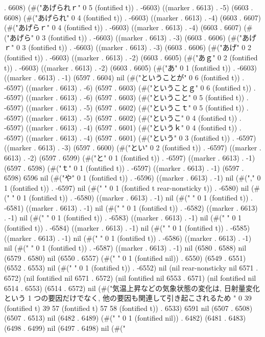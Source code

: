 . 6608) (#("あげられｒ" 0 5 (fontified t)) . -6603) ((marker . 6613) . -5) (6603 . 6608) (#("あげられ" 0 4 (fontified t)) . -6603) ((marker . 6613) . -4) (6603 . 6607) (#("あげらｒ" 0 4 (fontified t)) . -6603) ((marker . 6613) . -4) (6603 . 6607) (#("あげら" 0 3 (fontified t)) . -6603) ((marker . 6613) . -3) (6603 . 6606) (#("あげｒ" 0 3 (fontified t)) . -6603) ((marker . 6613) . -3) (6603 . 6606) (#("あげ" 0 2 (fontified t)) . -6603) ((marker . 6613) . -2) (6603 . 6605) (#("あｇ" 0 2 (fontified t)) . -6603) ((marker . 6613) . -2) (6603 . 6605) (#("あ" 0 1 (fontified t)) . -6603) ((marker . 6613) . -1) (6597 . 6604) nil (#("ということが" 0 6 (fontified t)) . -6597) ((marker . 6613) . -6) (6597 . 6603) (#("ということｇ" 0 6 (fontified t)) . -6597) ((marker . 6613) . -6) (6597 . 6603) (#("ということ" 0 5 (fontified t)) . -6597) ((marker . 6613) . -5) (6597 . 6602) (#("というこｔ" 0 5 (fontified t)) . -6597) ((marker . 6613) . -5) (6597 . 6602) (#("というこ" 0 4 (fontified t)) . -6597) ((marker . 6613) . -4) (6597 . 6601) (#("というｋ" 0 4 (fontified t)) . -6597) ((marker . 6613) . -4) (6597 . 6601) (#("という" 0 3 (fontified t)) . -6597) ((marker . 6613) . -3) (6597 . 6600) (#("とい" 0 2 (fontified t)) . -6597) ((marker . 6613) . -2) (6597 . 6599) (#("と" 0 1 (fontified t)) . -6597) ((marker . 6613) . -1) (6597 . 6598) (#("ｔ" 0 1 (fontified t)) . -6597) ((marker . 6613) . -1) (6597 . 6598) 6596 nil (#("や" 0 1 (fontified t)) . -6596) ((marker . 6613) . -1) nil (#("," 0 1 (fontified t)) . -6597) nil (#("
" 0 1 (fontified t rear-nonsticky t)) . -6580) nil (#("
" 0 1 (fontified t)) . -6580) ((marker . 6613) . -1) nil (#(" " 0 1 (fontified t)) . -6581) ((marker . 6613) . -1) nil (#(" " 0 1 (fontified t)) . -6582) ((marker . 6613) . -1) nil (#(" " 0 1 (fontified t)) . -6583) ((marker . 6613) . -1) nil (#(" " 0 1 (fontified t)) . -6584) ((marker . 6613) . -1) nil (#(" " 0 1 (fontified t)) . -6585) ((marker . 6613) . -1) nil (#(" " 0 1 (fontified t)) . -6586) ((marker . 6613) . -1) nil (#(" " 0 1 (fontified t)) . -6587) ((marker . 6613) . -1) nil (6580 . 6588) nil (6579 . 6580) nil (6550 . 6557) (#(" " 0 1 (fontified nil)) . 6550) (6549 . 6551) (6552 . 6553) nil (#("
" 0 1 (fontified t)) . -6552) nil (nil rear-nonsticky nil 6571 . 6572) (nil fontified nil 6571 . 6572) (nil fontified nil 6553 . 6571) (nil fontified nil 6514 . 6553) (6514 . 6572) nil (#("気温上昇などの気象状態の変化は, 日射量変化という 1 つの要因だけでなく,
他の要因も関連して引き起こされるため
" 0 39 (fontified t) 39 57 (fontified t) 57 58 (fontified t)) . 6533) 6591 nil (6507 . 6508) (6507 . 6513) nil (6482 . 6489) (#(" " 0 1 (fontified nil)) . 6482) (6481 . 6483) (6498 . 6499) nil (6497 . 6498) nil (#("
